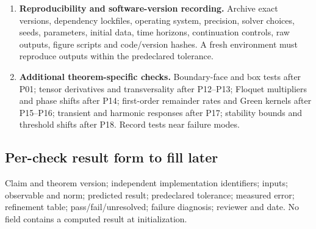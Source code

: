 \begin{enumerate}[label=V\arabic*.]
relative/absolute tolerances, continuation mesh, arithmetic precision, finite
difference increments and sampling horizons as appropriate. Record convergence
of each reported observable; a default tolerance is not evidence.
\item \textbf{Reproducibility and software-version recording.} Archive exact
versions, dependency lockfiles, operating system, precision, solver choices,
seeds, parameters, initial data, time horizons, continuation controls, raw
outputs, figure scripts and code/version hashes. A fresh environment must
reproduce outputs within the predeclared tolerance.
\item \textbf{Additional theorem-specific checks.} Boundary-face and box tests
after P01; tensor derivatives and transversality after P12--P13; Floquet
multipliers and phase shifts after P14; first-order remainder rates and Green
kernels after P15--P16; transient and harmonic responses after P17; stability
bounds and threshold shifts after P18. Record tests near failure modes.
\end{enumerate}
\subsection{Per-check result form to fill later}
Claim and theorem version; independent implementation identifiers; inputs;
observable and norm; predicted result; predeclared tolerance; measured error;
refinement table; pass/fail/unresolved; failure diagnosis; reviewer and date.
No field contains a computed result at initialization.
